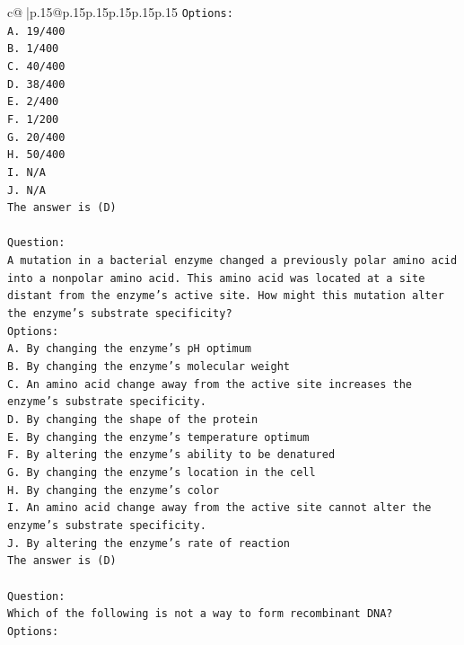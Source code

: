 \documentclass{article}
\begin{document}
{\begin{supertabular}{c@{$\;$}|p{.15\linewidth}@{}p{.15\linewidth}p{.15\linewidth}p{.15\linewidth}p{.15\linewidth}p{.15\linewidth}}
{{{\texttt{Options:} \\
\texttt{A. 19/400} \\
\texttt{B. 1/400} \\
\texttt{C. 40/400} \\
\texttt{D. 38/400} \\
\texttt{E. 2/400} \\
\texttt{F. 1/200} \\
\texttt{G. 20/400} \\
\texttt{H. 50/400} \\
\texttt{I. N/A} \\
\texttt{J. N/A} \\
\texttt{The answer is (D)} \\
\\ 
\texttt{Question:} \\
\texttt{A mutation in a bacterial enzyme changed a previously polar amino acid into a nonpolar amino acid. This amino acid was located at a site distant from the enzyme’s active site. How might this mutation alter the enzyme’s substrate specificity?} \\
\texttt{Options:} \\
\texttt{A. By changing the enzyme’s pH optimum} \\
\texttt{B. By changing the enzyme's molecular weight} \\
\texttt{C. An amino acid change away from the active site increases the enzyme's substrate specificity.} \\
\texttt{D. By changing the shape of the protein} \\
\texttt{E. By changing the enzyme's temperature optimum} \\
\texttt{F. By altering the enzyme's ability to be denatured} \\
\texttt{G. By changing the enzyme’s location in the cell} \\
\texttt{H. By changing the enzyme's color} \\
\texttt{I. An amino acid change away from the active site cannot alter the enzyme’s substrate specificity.} \\
\texttt{J. By altering the enzyme's rate of reaction} \\
\texttt{The answer is (D)} \\
\\ 
\texttt{Question:} \\
\texttt{Which of the following is not a way to form recombinant DNA?} \\
\texttt{Options:} \\
}}}
\end{supertabular}}
\end{document}
